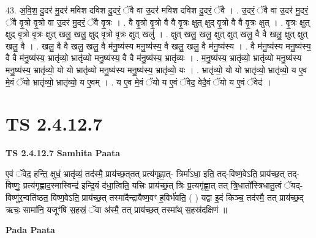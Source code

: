 \documentclass[17pt]{extarticle}
\begin{document}
43. अ॒वि॒श॒ दु॒दर॑ मु॒दर॑ मविश दविश दु॒दरं॒ ॅवै वा उ॒दर॑ मविश दविश दु॒दरं॒ ॅवै । . उ॒दरं॒ ॅवै वा उ॒दर॑ मु॒दरं॒ ॅवै वृ॒त्रो वृ॒त्रो वा उ॒दर॑ मु॒दरं॒ ॅवै वृ॒त्रः । . वै वृ॒त्रो वृ॒त्रो वै वै वृ॒त्रः क्षुत् क्षुद् वृ॒त्रो वै वै वृ॒त्रः क्षुत् । . वृ॒त्रः क्षुत् क्षुद् वृ॒त्रो वृ॒त्रः क्षुत् खलु॒ खलु॒ क्षुद् वृ॒त्रो वृ॒त्रः क्षुत् खलु॑ । . क्षुत् खलु॒ खलु॒ क्षुत् क्षुत् खलु॒ वै वै खलु॒ क्षुत् क्षुत् खलु॒ वै । . खलु॒ वै वै खलु॒ खलु॒ वै म॑नु॒ष्य॑स्य मनु॒ष्य॑स्य॒ वै खलु॒ खलु॒ वै म॑नु॒ष्य॑स्य । . वै म॑नु॒ष्य॑स्य मनु॒ष्य॑स्य॒ वै वै म॑नु॒ष्य॑स्य॒ भ्रातृ॑व्यो॒ भ्रातृ॑व्यो मनु॒ष्य॑स्य॒ वै वै म॑नु॒ष्य॑स्य॒ भ्रातृ॑व्यः । . म॒नु॒ष्य॑स्य॒ भ्रातृ॑व्यो॒ भ्रातृ॑व्यो मनु॒ष्य॑स्य मनु॒ष्य॑स्य॒ भ्रातृ॑व्यो॒ यो यो भ्रातृ॑व्यो मनु॒ष्य॑स्य मनु॒ष्य॑स्य॒ भ्रातृ॑व्यो॒ यः । . भ्रातृ॑व्यो॒ यो यो भ्रातृ॑व्यो॒ भ्रातृ॑व्यो॒ य ए॒व मे॒वं ॅयो भ्रातृ॑व्यो॒ भ्रातृ॑व्यो॒ य ए॒वम् । . य ए॒व मे॒वं ॅयो य ए॒वं ॅवेद॒ वेदै॒वं ॅयो य ए॒वं ॅवेद॑ । \newline
\pagebreak
{}

\section{ TS 2.4.12.7 }

\textbf{TS 2.4.12.7 } \newline
\textbf{Samhita Paata} \newline

ए॒वं ॅवेद॒ हन्ति॒ क्षुधं॒ भ्रातृ॑व्यं॒ तद॑स्मै॒ प्राय॑च्छ॒त्‌तत् प्रत्य॑गृह्णा॒त्-  त्रिर्मा॑ऽधा॒ इति॒ तद्-विष्ण॒वेऽति॒ प्राय॑च्छ॒त् तद्-विष्णुः॒ प्रत्य॑गृह्णाद॒स्मास्विन्द्र॑ इन्द्रि॒यं द॑धा॒त्विति॒ यत्त्रिः प्राय॑च्छ॒त् त्रिः प्र॒त्यगृ॑ह्णा॒त् तत् त्रि॒धातो᳚स्त्रिधातु॒त्वं ॅयद्-विष्णु॑र॒न्वति॑ष्ठत॒ विष्ण॒वेऽति॒ प्राय॑च्छ॒त् तस्मा॑दैन्द्रावैष्ण॒वꣳ ह॒विर्भ॑वति॒ ( ) यद्वा इ॒दं किञ्च॒ तद॑स्मै॒ तत् प्राय॑च्छ॒द् ऋचः॒ सामा॑नि॒ यजूꣳ॑षि स॒हस्रं॒ ॅवा अ॑स्मै॒ तत् प्राय॑च्छ॒त् तस्मा᳚थ् स॒हस्र॑दक्षिणं ॥ \newline

\textbf{Pada Paata} \newline
\end{document}
